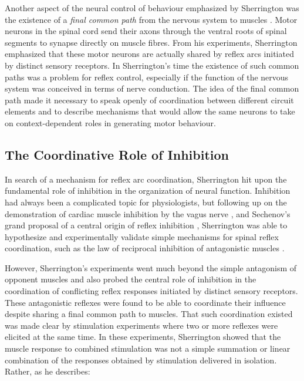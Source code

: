 Another aspect of the neural control of behaviour emphasized by Sherrington was the existence of a \emph{final common path} from the nervous system to muscles \cite{Sherrington1904}. Motor neurons in the spinal cord send their axons through the ventral roots of spinal segments to synapse directly on muscle fibres. From his experiments, Sherrington emphasized that these motor neurons are actually shared by reflex arcs initiated by distinct sensory receptors. In Sherrington's time the existence of such common paths was a problem for reflex control, especially if the function of the nervous system was conceived in terms of nerve conduction. The idea of the final common path made it necessary to speak openly of coordination between different circuit elements and to describe mechanisms that would allow the same neurons to take on context-dependent roles in generating motor behaviour.

\subsection{The Coordinative Role of Inhibition}

In search of a mechanism for reflex arc coordination, Sherrington hit upon the fundamental role of inhibition in the organization of neural function. Inhibition had always been a complicated topic for physiologists, but following up on the demonstration of cardiac muscle inhibition by the vagus nerve \cite{Weber1846}, and Sechenov's grand proposal of a central origin of reflex inhibition \cite{Sechenov1863}, Sherrington was able to hypothesize and experimentally validate simple mechanisms for spinal reflex coordination, such as the law of reciprocal inhibition of antagonistic muscles \cite{Sherrington1893b}.

However, Sherrington's experiments went much beyond the simple antagonism of opponent muscles and also probed the central role of inhibition in the coordination of conflicting reflex responses initiated by distinct sensory receptors. These antagonistic reflexes were found to be able to coordinate their influence despite sharing a final common path to muscles. That such coordination existed was made clear by stimulation experiments where two or more reflexes were elicited at the same time. In these experiments, Sherrington showed that the muscle response to combined stimulation was not a simple summation or linear combination of the responses obtained by stimulation delivered in isolation. Rather, as he describes:

